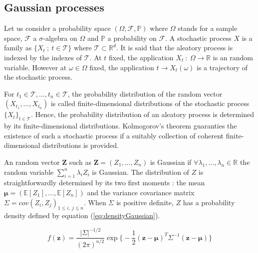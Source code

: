 \documentclass[soumission]{jsfds}
\edef\hc{\string: }
\begin{document}
\newpage


\begin{appendices}
	\renewcommand{\chaptername}{Appendix}
	\section{Gaussian processes \label{ap:GaussianProcesses}}
	Let us consider a probability space $(\Omega,\mathcal{F},\mathbb{P})$ where $\Omega$ stands for a sample space, $\mathcal{F}$ a $\sigma$-algebra on $\Omega$ and $\mathbb{P}$ a probability on $\mathcal{F}$. A stochastic process $X$ is a family as $\{ X_t\ ;\ t\in\mathcal{T}\}$ where $\mathcal{T}\subset\mathbb{R}^d$. It is said that the aleatory process is indexed by the indexes of $\mathcal{T}$. At $t$ fixed, the application $X_t \ : \ \Omega \rightarrow \mathbb{R}$ is an random variable. However at $\omega \in \Omega$ fixed, the application $ t \rightarrow X_t(\omega)$ is a trajectory of the stochastic process.\newline


For $t_1 \in \mathcal{T},\dots, t_n\in\mathcal{T}$, the probability distribution of the random vector $(X_{t_1},\dots,X_{t_n})$ is called finite-dimensional distributions of the stochastic process $\{X_t\}_{t\in\mathcal{T}}$. Hence, the probability distribution of an aleatory process is determined by its finite-dimensional distributions. Kolmogorov's theorem guaranties the existence of such a stochastic process if a suitably collection of coherent finite-dimensional distributions is provided.\newline

An random vector $\boldsymbol{Z}$ such as $\boldsymbol{Z}=(Z_1,\dots,Z_n)$ is Gaussian if $\forall \lambda_1,\dots,\lambda_n \in \mathbb{R}$ the random variable $\sum_{i=1}^n\lambda_iZ_i$ is Gaussian. The distribution of $Z$ is straightforwardly determined by its two first moments \hc the mean $\boldsymbol{\mu}=(\mathbb{E}[Z_1],\dots,\mathbb{E}[Z_n])$ and the variance covariance matrix $\Sigma = cov(Z_i,Z_j)_{1\leq i,\ j\leq n}$. When $\Sigma$ is positive definite, $Z$ has a probability density defined by equation (\ref{eq:densityGaussian}). \newline

\begin{equation}
f(\bm{z})=\frac{|\Sigma|^{-1/2}}{(2\pi)^{n/2}}\exp \Big\{-\frac{1}{2}(\boldsymbol{z}-\boldsymbol{\mu})^T\Sigma^{-1}(\boldsymbol{z}-\boldsymbol{\mu}) \Big\}
\label{eq:densityGaussian}
\end{equation}


\end{appendices}
\end{document}
